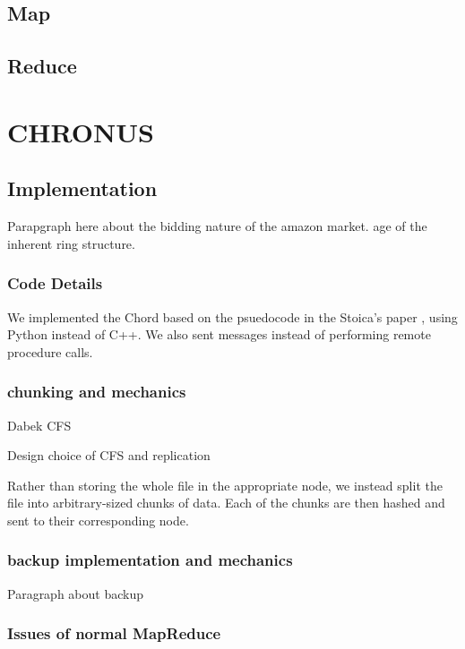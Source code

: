 \documentclass[conference, compsocconf, letterpaper]{IEEEtran}
\begin{document}
\subsection{Map}
\subsection{Reduce}


\section{CHRONUS}




\subsection{Implementation}
Parapgraph here about the bidding nature of the amazon market.
age of the inherent ring structure.





\subsubsection{Code Details}
We implemented the Chord based on the psuedocode  in the Stoica's paper \cite{Chord}, using Python instead of C++.  We also sent messages instead of performing remote procedure calls.


\subsubsection{chunking and mechanics }

Dabek CFS \cite{CFS}

Design choice of CFS and replication 


Rather than storing the whole file in the appropriate node, we instead split the file into arbitrary-sized chunks of data.  Each of the chunks are then hashed and sent to their corresponding node.

\subsubsection{backup implementation and mechanics}
Paragraph about backup

\subsubsection{Issues of normal MapReduce } 
\end{document}
